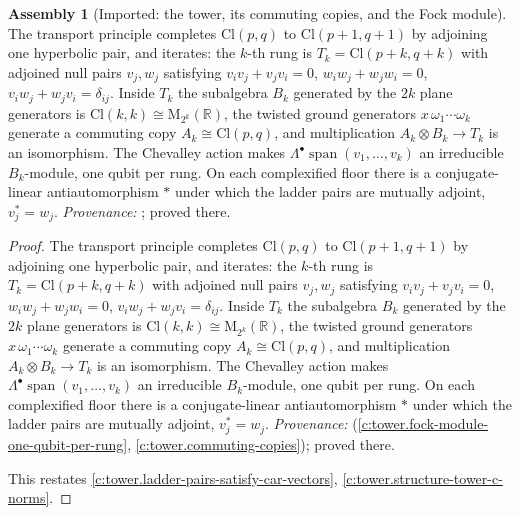 \documentclass[11pt]{article}
\theoremstyle{definition}
\newtheorem{assembled}[theorem]{Assembly}
\theoremstyle{plain}
\newcommand{\changedmark}[2]{\marginpar{\raggedright\scriptsize\color{#1}#2}}
\providecommand{\Cl}{}\renewcommand{\Cl}{\mathrm{Cl}}
\providecommand{\R}{}\renewcommand{\R}{\mathbb{R}}
\begin{document}
\begin{assembled}[Imported: the tower, its commuting copies, and the Fock module]\label{c:standard-model.imported-tower-commuting-copies-fock-module}
\changedmark{gray}{reworded}
The transport principle completes $\Cl(p,q)$ to $\Cl(p{+}1, q{+}1)$ by adjoining one hyperbolic pair, and iterates: the $k$-th rung is $T_{k} = \Cl(p{+}k, q{+}k)$ with adjoined null pairs $v_{j}, w_{j}$ satisfying $v_{i}v_{j} + v_{j}v_{i} = 0$, $w_{i}w_{j} + w_{j}w_{i} = 0$, $v_{i}w_{j} + w_{j}v_{i} = \delta_{ij}$. Inside $T_{k}$ the subalgebra $B_{k}$ generated by the $2k$ plane generators is $\Cl(k,k) \cong \mathrm{M}_{2^{k}}(\R)$, the twisted ground generators $x\,\omega_{1}\cdots\omega_{k}$ generate a commuting copy $A_{k} \cong \Cl(p,q)$, and multiplication $A_{k} \otimes B_{k} \to T_{k}$ is an isomorphism. The Chevalley action makes $\Lambda^{\bullet}\operatorname{span}(v_{1}, \ldots, v_{k})$ an irreducible $B_{k}$-module, one qubit per rung. On each complexified floor there is a conjugate-linear antiautomorphism $*$ under which the ladder pairs are mutually adjoint, $v_{j}^{*} = w_{j}$. \emph{Provenance:} \cite[Thms.~3.2, 4.2]{ButlerT3}; proved there.
\end{assembled}
\begin{proof}
The transport principle completes $\Cl(p,q)$ to $\Cl(p{+}1, q{+}1)$ by adjoining one hyperbolic pair, and iterates: the $k$-th rung is $T_{k} = \Cl(p{+}k, q{+}k)$ with adjoined null pairs $v_{j}, w_{j}$ satisfying $v_{i}v_{j} + v_{j}v_{i} = 0$, $w_{i}w_{j} + w_{j}w_{i} = 0$, $v_{i}w_{j} + w_{j}v_{i} = \delta_{ij}$. Inside $T_{k}$ the subalgebra $B_{k}$ generated by the $2k$ plane generators is $\Cl(k,k) \cong \mathrm{M}_{2^{k}}(\R)$, the twisted ground generators $x\,\omega_{1}\cdots\omega_{k}$ generate a commuting copy $A_{k} \cong \Cl(p,q)$, and multiplication $A_{k} \otimes B_{k} \to T_{k}$ is an isomorphism. The Chevalley action makes $\Lambda^{\bullet}\operatorname{span}(v_{1}, \ldots, v_{k})$ an irreducible $B_{k}$-module, one qubit per rung. On each complexified floor there is a conjugate-linear antiautomorphism $*$ under which the ladder pairs are mutually adjoint, $v_{j}^{*} = w_{j}$. \emph{Provenance:} \cite[Thms.~3.2, 4.2]{ButlerT3} (\ref{c:tower.fock-module-one-qubit-per-rung}, \ref{c:tower.commuting-copies}); proved there.

This restates \ref{c:tower.ladder-pairs-satisfy-car-vectors}, \ref{c:tower.structure-tower-c-norms}.

\end{proof}
\end{document}
